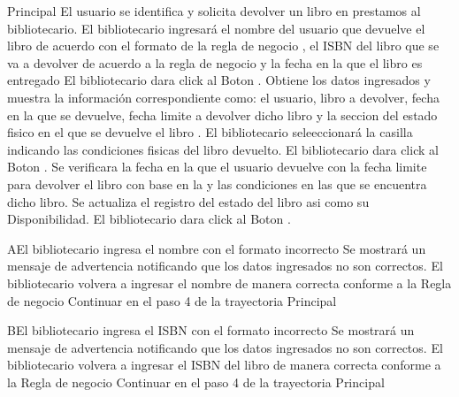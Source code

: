 	\begin{UCtrayectoria}{Principal}
		\UCpaso[\UCactor] El usuario se identifica y solicita devolver un libro en prestamos al bibliotecario.  
		\UCpaso[\UCactor] El bibliotecario ingresará el nombre del usuario que devuelve el libro de acuerdo con el formato de la regla de negocio , el ISBN del libro que se va a devolver de acuerdo a la regla de negocio  y la fecha en la que el libro es entregado   
		\UCpaso[\UCactor] El bibliotecario dara click al Boton .
				\UCpaso[\UCsist] Obtiene los datos ingresados y muestra la información correspondiente como: el usuario, libro a devolver, fecha en la que se devuelve, fecha limite a devolver dicho libro y la seccion del estado fisico en el que se devuelve el libro .
\UCpaso[\UCactor] El bibliotecario seleeccionará la casilla indicando las condiciones fisicas del libro devuelto.						
						\UCpaso[\UCactor] El bibliotecario dara click al Boton  .
		\UCpaso[\UCsist] Se verificara la fecha en la que el usuario devuelve con la fecha limite para devolver el libro con base en la  y las condiciones en las que se encuentra dicho libro. 
				\UCpaso[\UCsist] Se actualiza el registro del estado del libro asi como su Disponibilidad.   
	\UCpaso[\UCactor] El bibliotecario dara click al Boton .
	\end{UCtrayectoria}
				\begin{UCtrayectoriaA}{A}{El bibliotecario ingresa el nombre con el formato incorrecto}
			\UCpaso[\UCsist] Se mostrará un mensaje de advertencia notificando que los datos ingresados no son correctos. 
			\UCpaso[\UCactor] El bibliotecario volvera a ingresar el nombre de manera correcta conforme a la Regla de negocio  
			\UCpaso[\UCsist]Continuar en el paso 4 de la trayectoria Principal
		\end{UCtrayectoriaA}
		
\begin{UCtrayectoriaA}{B}{El bibliotecario ingresa el ISBN con el formato incorrecto}
			\UCpaso[\UCsist] Se mostrará un mensaje de advertencia notificando que los datos ingresados no son correctos. 
			\UCpaso[\UCactor] El bibliotecario volvera a ingresar el ISBN del libro de manera correcta conforme a la Regla de negocio  
			\UCpaso[\UCsist]Continuar en el paso 4 de la trayectoria Principal
		\end{UCtrayectoriaA}
		
